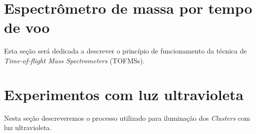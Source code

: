 \section{Espectrômetro de massa por tempo de voo}
\label{sec:tof}
Esta seção será dedicada a descrever o princípio de funcionamento da técnica de \textit{Time-of-flight Mass Spectrometers} (TOFMSs).


\section{Experimentos com luz ultravioleta}
\label{sec:led}

Nesta seção descreveremos o processo utilizado para iluminação dos \textit{Clusters} com luz ultravioleta.



